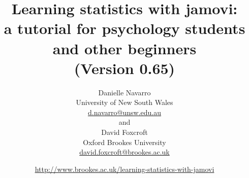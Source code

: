 

\date{\url{http://www.brookes.ac.uk/learning-statistics-with-jamovi} \hfill \\ }
\title{Learning statistics with jamovi:\\ a tutorial for psychology students and other beginners \vspace*{12pt}
\\ (Version 0.65) \\ \vspace*{24pt}}
\author{Danielle Navarro \\ University of New South Wales \\ \url{d.navarro@unsw.edu.au} \vspace*{12pt} \\
and \vspace*{12pt} \\
David Foxcroft \\ Oxford Brookes University \\ \url{david.foxcroft@brookes.ac.uk} \vspace*{36pt}}


 
